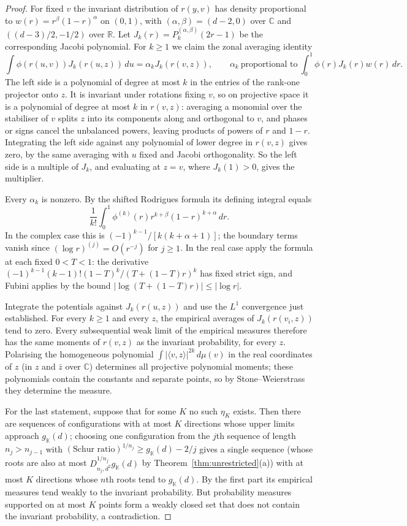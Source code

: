 \documentclass[11pt,a4paper]{article}
\theoremstyle{remark}
\newcommand{\C}{\mathbb C}
\newcommand{\R}{\mathbb R}
\newcommand{\K}{\mathbb K}
\begin{document}
\begin{proof}
For fixed $v$ the invariant distribution of $r(y,v)$ has density proportional to $w(r)=r^{\beta}(1-r)^{\alpha}$ on $(0,1)$, with $(\alpha,\beta)=(d-2,0)$ over $\C$ and $((d-3)/2,-1/2)$ over $\R$. Let $J_k(r)=P_k^{(\alpha,\beta)}(2r-1)$ be the corresponding Jacobi polynomial. For $k\ge1$ we claim the zonal averaging identity
\[
 \int\phi(r(u,v))J_k(r(u,z))\,du=\alpha_k J_k(r(v,z)),
 \qquad \alpha_k\ \text{proportional to}\
 \int_0^1\phi(r)J_k(r)w(r)\,dr .
\]
The left side is a polynomial of degree at most $k$ in the entries of the rank-one projector onto $z$. It is invariant under rotations fixing $v$, so on projective space it is a polynomial of degree at most $k$ in $r(v,z)$: averaging a monomial over the stabiliser of $v$ splits $z$ into its components along and orthogonal to $v$, and phases or signs cancel the unbalanced powers, leaving products of powers of $r$ and $1-r$. Integrating the left side against any polynomial of lower degree in $r(v,z)$ gives zero, by the same averaging with $u$ fixed and Jacobi orthogonality. So the left side is a multiple of $J_k$, and evaluating at $z=v$, where $J_k(1)>0$, gives the multiplier.

Every $\alpha_k$ is nonzero. By the shifted Rodrigues formula its defining integral equals
\[
 \frac1{k!}\int_0^1 \phi^{(k)}(r)r^{k+\beta}(1-r)^{k+\alpha}\,dr.
\]
In the complex case this is $(-1)^{k-1}/[k(k+\alpha+1)]$; the boundary terms vanish since $(\log r)^{(j)}=O(r^{-j})$ for $j\ge1$. In the real case apply the formula at each fixed $0<T<1$: the derivative $(-1)^{k-1}(k-1)!(1-T)^k/(T+(1-T)r)^k$ has fixed strict sign, and Fubini applies by the bound $|\log(T+(1-T)r)|\le|\log r|$.

Integrate the potentials against $J_k(r(u,z))$ and use the $L^1$ convergence just established. For every $k\ge1$ and every $z$, the empirical averages of $J_k(r(v_i,z))$ tend to zero. Every subsequential weak limit of the empirical measures therefore has the same moments of $r(v,z)$ as the invariant probability, for every $z$. Polarising the homogeneous polynomial $\int|\langle v,z\rangle|^{2k}\,d\mu(v)$ in the real coordinates of $z$ (in $z$ and $\bar z$ over $\C$) determines all projective polynomial moments; these polynomials contain the constants and separate points, so by Stone--Weierstrass they determine the measure.

For the last statement, suppose that for some $K$ no such $\eta_K$ exists. Then there are sequences of configurations with at most $K$ directions whose upper limits approach $g_\K(d)$; choosing one configuration from the $j$th sequence of length $n_j>n_{j-1}$ with $(\text{Schur ratio})^{1/n_j}\ge g_\K(d)-2/j$ gives a single sequence (whose roots are also at most $D_{n_j,d^2}^{1/n_j}g_\K(d)$ by Theorem~\ref{thm:unrestricted}(a)) with at most $K$ directions whose $n$th roots tend to $g_\K(d)$. By the first part its empirical measures tend weakly to the invariant probability. But probability measures supported on at most $K$ points form a weakly closed set that does not contain the invariant probability, a contradiction.
\end{proof}
\end{document}

